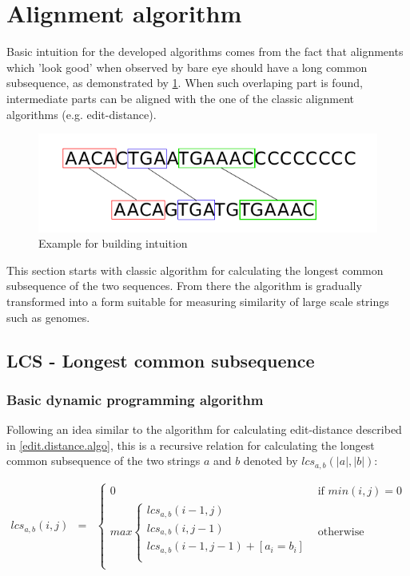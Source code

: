 \documentclass[times, utf8, diplomski]{fer}
\begin{document}
\section{Alignment algorithm}
Basic intuition for the developed algorithms comes from the fact that alignments which 'look good' when observed by bare eye should have a long common subsequence, as demonstrated by \ref{lcs.intuition}. When such overlaping part is found, intermediate parts can be aligned with the one of the classic alignment algorithms (e.g. edit-distance).

\begin{figure}[H]
\centering
\includegraphics[width=1.0\textwidth]{../img/lcs-intuition.png}
\caption{Example for building intuition}\label{lcs.intuition}
\end{figure}

This section starts with classic algorithm for calculating the longest common subsequence of the two sequences. From there the algorithm is gradually transformed into a form suitable for measuring similarity of large scale strings such as genomes.

\subsection{LCS - Longest common subsequence}

\subsubsection{Basic dynamic programming algorithm}

Following an idea similar to the algorithm for calculating edit-distance described in \ref{edit.distance.algo}, this is a recursive relation for calculating the longest common subsequence of the two strings $a$ and $b$ denoted by $lcs_{a,b}(|a|,|b|)$:

\begin{eqnarray}
	\label{levenshtein}
	lcs_{a,b}\left(i,j\right) & = & 
							\left\{
								\begin{array}{ll}
								0 & \mbox{if } min(i,j) = 0\\	
								max\left\{
									\begin{array}{ll}
									lcs_{a,b}(i-1,j)\\	
									lcs_{a,b}(i,j-1)\\	
									lcs_{a,b}(i-1,j-1) + [a_i=b_i]\\	
									\end{array}
									\right.&\mbox{otherwise}\\
								\end{array}
							\right.
\end{eqnarray}
\end{document}

